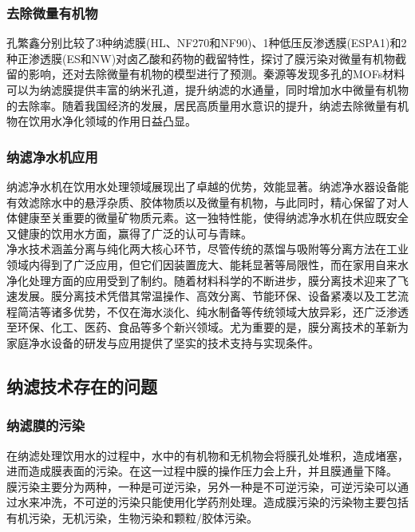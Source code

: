 \documentclass[a4paper,onecolumn,twoside]{article}
\begin{document}
    \subsubsection{去除微量有机物}
    孔繁鑫分别比较了3种纳滤膜(HL、NF270和NF90)、1种低压反渗透膜(ESPA1)和2种正渗透膜(ES和NW)对卤乙酸和药物的截留特性，探讨了膜污染对微量有机物截留的影响，还对去除微量有机物的模型进行了预测\cite{KongShenTouMoDuiWeiLiangYouJiWuDeQuChuYuChuanZhiTeXingYanJiu2016}。秦源等发现多孔的MOFs材料可以为纳滤膜提供丰富的纳米孔道，提升纳滤的水通量，同时增加水中微量有机物的去除率\cite{QinMOFsGaiXingNaLuMoQuChuYinYongShuiZhongWeiLiangYouJiWuJinZhan2022}。随着我国经济的发展，居民高质量用水意识的提升，纳滤去除微量有机物在饮用水净化领域的作用日益凸显。
    \subsubsection{纳滤净水机应用}
  纳滤净水机在饮用水处理领域展现出了卓越的优势，效能显著。纳滤净水器设备能有效滤除水中的悬浮杂质、胶体物质以及微量有机物，与此同时，精心保留了对人体健康至关重要的微量矿物质元素。这一独特性能，使得纳滤净水机在供应既安全又健康的饮用水方面，赢得了广泛的认可与青睐。\\
  净水技术涵盖分离与纯化两大核心环节，尽管传统的蒸馏与吸附等分离方法在工业领域内得到了广泛应用，但它们因装置庞大、能耗显著等局限性，而在家用自来水净化处理方面的应用受到了制约。随着材料科学的不断进步，膜分离技术迎来了飞速发展。膜分离技术凭借其常温操作、高效分离、节能环保、设备紧凑以及工艺流程简洁等诸多优势，不仅在海水淡化、纯水制备等传统领域大放异彩，还广泛渗透至环保、化工、医药、食品等多个新兴领域\cite{QinMoFenChiJiShuZaiJiaYongJingShuiJiZhongDeYingYong2018}。尤为重要的是，膜分离技术的革新为家庭净水设备的研发与应用提供了坚实的技术支持与实现条件。
  
  \subsection{纳滤技术存在的问题}
    \subsubsection{纳滤膜的污染}
  在纳滤处理饮用水的过程中，水中的有机物和无机物会将膜孔处堆积，造成堵塞，进而造成膜表面的污染。在这一过程中膜的操作压力会上升，并且膜通量下降。\\
  膜污染主要分为两种，一种是可逆污染，另外一种是不可逆污染，可逆污染可以通过水来冲洗，不可逆的污染只能使用化学药剂处理。造成膜污染的污染物主要包括有机污染，无机污染，生物污染和颗粒/胶体污染\cite{ZhaoMoFenChiJiShuZaiZaiShengShuiZhongDeYingYongJiMoWuRanYanJiuJinZhan2021}。
\end{document}
